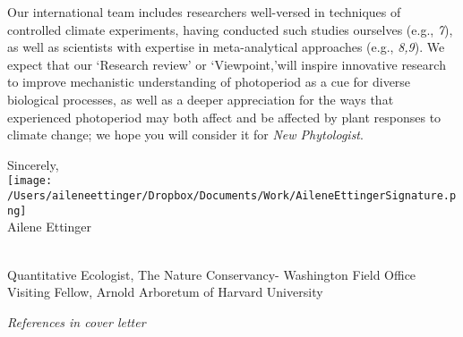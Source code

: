 \documentclass[10.5pt,a4paper]{letter}
\begin{document}
\begin{letter}{}
\par Our international team includes researchers well-versed in techniques of controlled climate experiments, having conducted such studies ourselves (e.g., \emph{7}), as well as scientists with expertise in meta-analytical approaches (e.g., \emph{8,9}). We expect that our `Research review' or `Viewpoint,'will inspire innovative research to
improve mechanistic understanding of photoperiod as a cue for diverse biological processes, as well as a deeper appreciation for the ways that experienced photoperiod may both affect and be affected by plant responses to climate change; we hope you will consider it for \emph{New Phytologist}.

\par Sincerely,\\

\texttt{[image: /Users/aileneettinger/Dropbox/Documents/Work/AileneEttingerSignature.png]} \\
Ailene Ettinger
\begin{footnotesize}\\
Quantitative Ecologist, The Nature Conservancy- Washington Field Office\\
Visiting Fellow, Arnold Arboretum of Harvard University 
\end{footnotesize}
 
 \noindent \emph{References in cover letter}


\end{letter}
\end{document}
